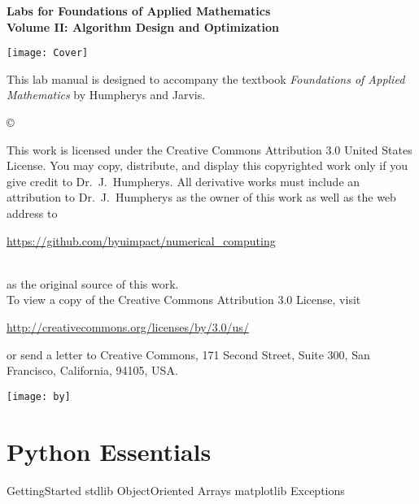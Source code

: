 \documentclass[nociteref]{SIAM-GH-book}
\begin{document}

\thispagestyle{empty} %

\begin{center}
{\huge \bf Labs for Foundations of Applied Mathematics} \\
\vspace{5mm}
{\Large \bf Volume II: Algorithm Design and Optimization}
\vspace{20mm}

\texttt{[image: Cover]}
\end{center}
\frontmatter



\begin{thepreface} %

This lab manual is designed to accompany the textbook \emph{Foundations of Applied Mathematics} by Humpherys and Jarvis.

\vfill
\copyright{This work is licensed under the Creative Commons Attribution 3.0 United States
License.  You may copy, distribute, and display this copyrighted work only if you give
credit to Dr.~J.~Humpherys. All derivative works must include an attribution to Dr.~J.~Humpherys as the owner of this work as well as the web address to
\\\centerline{\url{https://github.com/byuimpact/numerical_computing}}\\ as the original source of
this
work.\\To view a copy of the Creative Commons Attribution 3.0 License,
visit\\\centerline{\url{http://creativecommons.org/licenses/by/3.0/us/}} or send a letter to
Creative Commons, 171 Second Street, Suite 300, San Francisco, California, 94105, USA.}

\vfill
\centering\texttt{[image: by]}
\vfill
\end{thepreface}

\setcounter{tocdepth}{1}
\tableofcontents

\mainmatter


\part{Python Essentials}
{GettingStarted}
{stdlib}
{ObjectOriented}
{Arrays}
{matplotlib}
{Exceptions}
\end{document}
